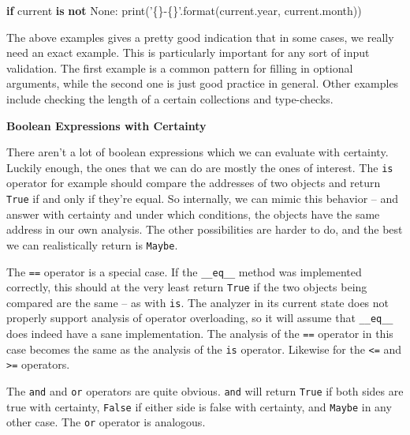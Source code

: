 \documentclass[]{article}
\newenvironment{Shaded}{}{}
\newcommand{\KeywordTok}[1]{\textcolor[rgb]{0.00,0.44,0.13}{\textbf{#1}}}
\newcommand{\SpecialCharTok}[1]{\textcolor[rgb]{0.25,0.44,0.63}{#1}}
\newcommand{\StringTok}[1]{\textcolor[rgb]{0.25,0.44,0.63}{#1}}
\newcommand{\VariableTok}[1]{\textcolor[rgb]{0.10,0.09,0.49}{#1}}
\newcommand{\ControlFlowTok}[1]{\textcolor[rgb]{0.00,0.44,0.13}{\textbf{#1}}}
\newcommand{\BuiltInTok}[1]{#1}
\newcommand{\NormalTok}[1]{#1}
\begin{document}
\begin{Shaded}
\begin{Highlighting}[]
\ControlFlowTok{if}\NormalTok{ current }\KeywordTok{is} \KeywordTok{not} \VariableTok{None}\NormalTok{:}
  \BuiltInTok{print}\NormalTok{(}\StringTok{'}\SpecialCharTok{\{\}}\StringTok{-}\SpecialCharTok{\{\}}\StringTok{'}\NormalTok{.}\BuiltInTok{format}\NormalTok{(current.year, }
\NormalTok{                       current.month))}
\end{Highlighting}
\end{Shaded}

The above examples gives a pretty good indication that in some cases, we
really need an exact example. This is particularly important for any
sort of input validation. The first example is a common pattern for
filling in optional arguments, while the second one is just good
practice in general. Other examples include checking the length of a
certain collections and type-checks.

\textbf{Boolean Expressions with Certainty}

There aren't a lot of boolean expressions which we can evaluate with
certainty. Luckily enough, the ones that we can do are mostly the ones
of interest. The \texttt{is} operator for example should compare the
addresses of two objects and return \texttt{True} if and only if they're
equal. So internally, we can mimic this behavior -- and answer with
certainty and under which conditions, the objects have the same address
in our own analysis. The other possibilities are harder to do, and the
best we can realistically return is \texttt{Maybe}.

The \texttt{==} operator is a special case. If the \texttt{\_\_eq\_\_}
method was implemented correctly, this should at the very least return
\texttt{True} if the two objects being compared are the same -- as with
\texttt{is}. The analyzer in its current state does not properly support
analysis of operator overloading, so it will assume that
\texttt{\_\_eq\_\_} does indeed have a sane implementation. The analysis
of the \texttt{==} operator in this case becomes the same as the
analysis of the \texttt{is} operator. Likewise for the
\texttt{\textless{}=} and \texttt{\textgreater{}=} operators.

The \texttt{and} and \texttt{or} operators are quite obvious.
\texttt{and} will return \texttt{True} if both sides are true with
certainty, \texttt{False} if either side is false with certainty, and
\texttt{Maybe} in any other case. The \texttt{or} operator is analogous.
\end{document}
